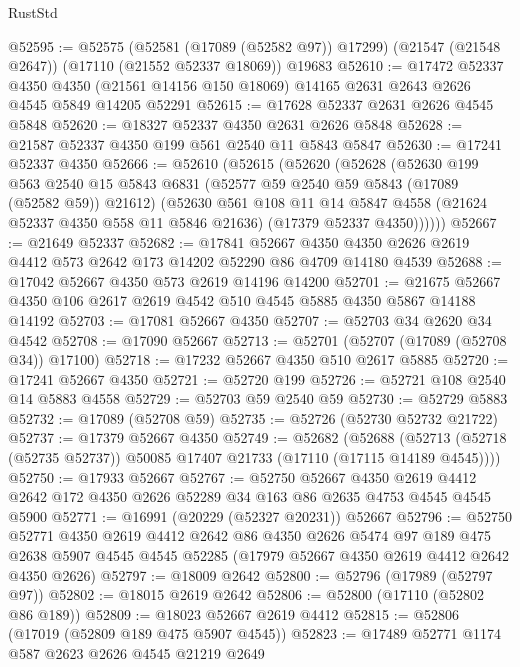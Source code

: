 \begin{lexlean}{RustStd}
\begin{coremodule}
@52595 := @52575
    (@52581 (@17089 (@52582 @97)) @17299)
    (@21547 (@21548 @2647))
    (@17110 (@21552 @52337 @18069))
    @19683
@52610 := @17472
    @52337
    @4350
    @4350
    (@21561 @14156 @150 @18069)
    @14165
    @2631
    @2643
    @2626
    @4545
    @5849
    @14205
    @52291
@52615 := @17628 @52337 @2631 @2626 @4545 @5848
@52620 := @18327 @52337 @4350 @2631 @2626 @5848
@52628 := @21587 @52337 @4350 @199 @561 @2540 @11 @5843 @5847
@52630 := @17241 @52337 @4350
@52666 := @52610
    (@52615
      (@52620
        (@52628
          (@52630
            @199
            @563
            @2540
            @15
            @5843
            @6831
            (@52577 @59 @2540 @59 @5843 (@17089 (@52582 @59)) @21612)
            (@52630
              @561
              @108
              @11
              @14
              @5847
              @4558
              (@21624 @52337 @4350 @558 @11 @5846 @21636)
              (@17379 @52337 @4350))))))
@52667 := @21649 @52337
@52682 := @17841
    @52667
    @4350
    @4350
    @2626
    @2619
    @4412
    @573
    @2642
    @173
    @14202
    @52290
    @86
    @4709
    @14180
    @4539
@52688 := @17042 @52667 @4350 @573 @2619 @14196 @14200
@52701 := @21675 @52667 @4350 @106 @2617 @2619 @4542 @510 @4545 @5885 @4350 @5867 @14188 @14192
@52703 := @17081 @52667 @4350
@52707 := @52703 @34 @2620 @34 @4542
@52708 := @17090 @52667
@52713 := @52701 (@52707 (@17089 (@52708 @34)) @17100)
@52718 := @17232 @52667 @4350 @510 @2617 @5885
@52720 := @17241 @52667 @4350
@52721 := @52720 @199
@52726 := @52721 @108 @2540 @14 @5883 @4558
@52729 := @52703 @59 @2540 @59
@52730 := @52729 @5883
@52732 := @17089 (@52708 @59)
@52735 := @52726 (@52730 @52732 @21722)
@52737 := @17379 @52667 @4350
@52749 := @52682
    (@52688 (@52713 (@52718 (@52735 @52737)) @50085 @17407 @21733 (@17110 (@17115 @14189 @4545))))
@52750 := @17933 @52667
@52767 := @52750
    @52667
    @4350
    @2619
    @4412
    @2642
    @172
    @4350
    @2626
    @52289
    @34
    @163
    @86
    @2635
    @4753
    @4545
    @4545
    @5900
@52771 := @16991 (@20229 (@52327 @20231)) @52667
@52796 := @52750
    @52771
    @4350
    @2619
    @4412
    @2642
    @86
    @4350
    @2626
    @5474
    @97
    @189
    @475
    @2638
    @5907
    @4545
    @4545
    @52285
    (@17979 @52667 @4350 @2619 @4412 @2642 @4350 @2626)
@52797 := @18009 @2642
@52800 := @52796 (@17989 (@52797 @97))
@52802 := @18015 @2619 @2642
@52806 := @52800 (@17110 (@52802 @86 @189))
@52809 := @18023 @52667 @2619 @4412
@52815 := @52806 (@17019 (@52809 @189 @475 @5907 @4545))
@52823 := @17489 @52771 @1174 @587 @2623 @2626 @4545 @21219 @2649

\end{coremodule}
\end{lexlean}
